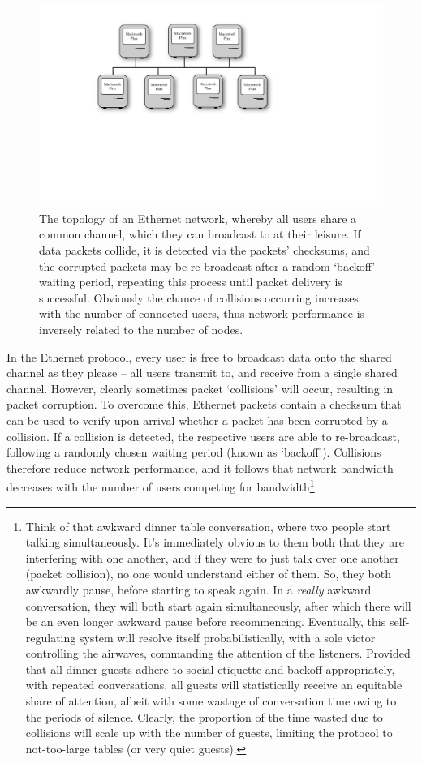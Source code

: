 \documentclass[aps, rmp, twocolumn, amsmath, amssymb, nofootinbib, superscriptaddress, longbibliography, floatfix, table-of-contents, eqsecnum]{revtex4-1}
\begin{document}
\begin{figure}[!htb]
	\includegraphics[width=\columnwidth]{ethernet}
	\caption{The topology of an Ethernet network, whereby all users share a common channel, which they can broadcast to at their leisure. If data packets collide, it is detected via the packets' checksums, and the corrupted packets may be re-broadcast after a random `backoff' waiting period, repeating this process until packet delivery is successful. Obviously the chance of collisions occurring increases with the number of connected users, thus network performance is inversely related to the number of nodes.} \label{fig:ethernet}
\end{figure}

In the Ethernet protocol, every user is free to broadcast data onto the shared channel as they please -- all users transmit to, and receive from a single shared channel. However, clearly sometimes packet `collisions' will occur, resulting in packet corruption. To overcome this, Ethernet packets contain a checksum that can be used to verify upon arrival whether a packet has been corrupted by a collision. If a collision is detected, the respective users are able to re-broadcast, following a randomly chosen waiting period (known as `backoff'). Collisions therefore reduce network performance, and it follows that network bandwidth decreases with the number of users competing for bandwidth\footnote{Think of that awkward dinner table conversation, where two people start talking simultaneously. It's immediately obvious to them both that they are interfering with one another, and if they were to just talk over one another (packet collision), no one would understand either of them. So, they both awkwardly pause, before starting to speak again. In a \textit{really} awkward conversation, they will both start again simultaneously, after which there will be an even longer awkward pause before recommencing. Eventually, this self-regulating system will resolve itself probabilistically, with a sole victor controlling the airwaves, commanding the attention of the listeners. Provided that all dinner guests adhere to social etiquette and backoff appropriately, with repeated conversations, all guests will statistically receive an equitable share of attention, albeit with some wastage of conversation time owing to the periods of silence. Clearly, the proportion of the time wasted due to collisions will scale up with the number of guests, limiting the protocol to not-too-large tables (or very quiet guests).}.
\end{document}

